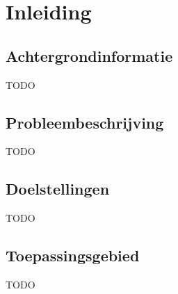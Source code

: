 \chapter{Inleiding}
\label{inleiding}

\section{Achtergrondinformatie}
TODO

\section{Probleembeschrijving}
TODO

\section{Doelstellingen}
TODO

\section{Toepassingsgebied}
TODO



